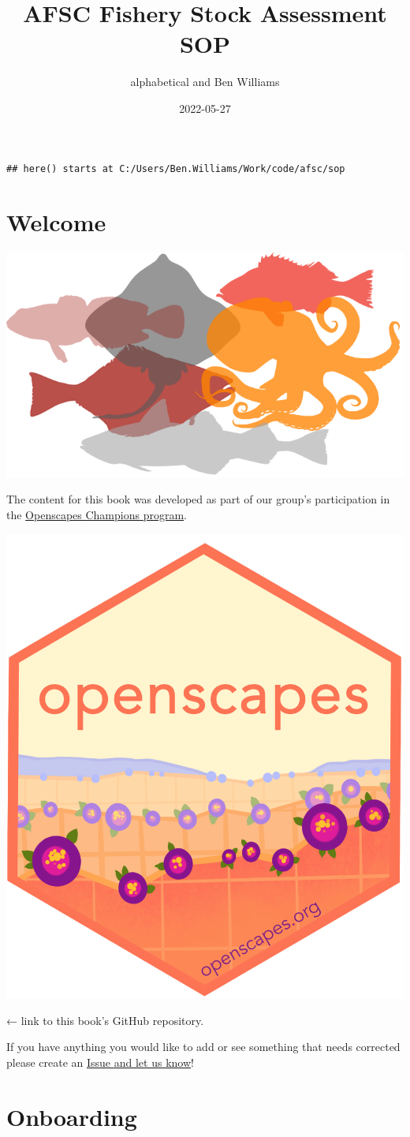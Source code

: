 \documentclass[
]{book}
\title{AFSC Fishery Stock Assessment SOP}
\author{alphabetical and Ben Williams}
\date{2022-05-27}
\begin{document}
\maketitle

{
\setcounter{tocdepth}{1}
\tableofcontents
}
\begin{verbatim}
## here() starts at C:/Users/Ben.Williams/Work/code/afsc/sop
\end{verbatim}

\hypertarget{welcome}{%
\chapter{Welcome}\label{welcome}}

\includegraphics{images/cover.png}

The content for this book was developed as part of our group's participation in the \href{https://openscapes.org}{Openscapes Champions program}.

\includegraphics[width=0.25\linewidth]{images/openscapes_hex_badge}

← link to this book's GitHub repository.

If you have anything you would like to add or see something that needs corrected please create an \href{https://github.com/afsc-assessments/sop/issues}{Issue and let us know}!

\hypertarget{onboarding}{%
\chapter{Onboarding}\label{onboarding}}
\end{document}
